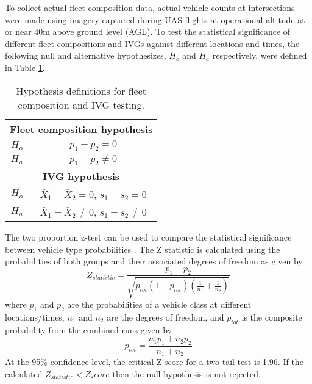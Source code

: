 \documentclass[preprint,12pt,a4paper,authoryear]{elsarticle}
\begin{document}
\begin{linenumbers}
To collect actual fleet composition data, actual vehicle counts at intersections were made using imagery captured during UAS flights at operational altitude at or near 40m above ground level (AGL). To test the statistical significance of different fleet compositions and IVGs against different locations and times, the following null and alternative hypothesizes, $H_{o}$ and $H_{a}$ respectively, were defined in Table \ref{tab:vehhyp}. 
%
\begin{table}[H]
\centering
\caption{Hypothesis definitions for fleet composition and IVG testing.}
\label{tab:vehhyp}
\begin{tabular}{@{}cc@{}}
\toprule
\multicolumn{2}{c}{\textbf{Fleet composition hypothesis}} \\ \midrule
$H_{o}$ & $p_{1} - p_{2} = 0$ \\
$H_{a}$ & $p_{1} - p_{2} \ne 0$\\ \midrule
\multicolumn{2}{c}{\textbf{IVG hypothesis}} \\ \midrule
$H_{o}$ & $\bar{X}_{1} - \bar{X}_{2} = 0$, $s_{1} - s_{2} = 0$ \\
$H_{a}$ & $\bar{X}_{1} - \bar{X}_{2} \ne 0$, $s_{1} - s_{2} \ne 0$ \\ \bottomrule
\end{tabular}
\end{table}
%
The two proportion z-test can be used to compare the statistical significance between vehicle type probabilities \citep{Presnell2008}. The Z statistic is calculated using the probabilities of both groups and their associated degrees of freedom as given by
% 
\begin{equation}
\label{eq:2zteststat}
Z_{statistic} = \frac{p_{1}-p_{2}}{\sqrt{p_{tot}(1-p_{tot})\left ( \frac{1}{n_{1}}+\frac{1}{n_{2}} \right )}}
\end{equation}
%
\noindent
where $p_{1}$ and $p_{2}$ are the probabilities of a vehicle class at different locations/times, $n_{1}$ and $n_{2}$ are the degrees of freedom, and $p_{tot}$ is the composite probability from the combined runs given by
% 
\begin{equation}
\label{eq:2ztesttot}
p_{tot}=\frac{n_{1}p_{1} + n_{2}p_{2}}{n_{1}+n_{2}}
\end{equation}
%
At the 95\% confidence level, the critical Z score for a two-tail test is 1.96. If the calculated $Z_{statistic} < Z_score$ then the null hypothesis is not rejected. 


\end{linenumbers}
\end{document}
